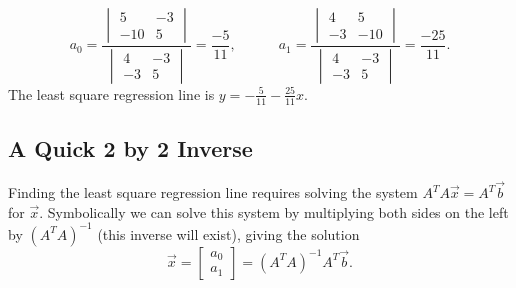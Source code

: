 \begin{example}
$$
a_0
=\frac{\begin{vmatrix}
5&-3\\
-10&5
\end{vmatrix}}{\begin{vmatrix}
4&-3\\
-3&5
\end{vmatrix}}
=\dfrac{-5}{11}
, \quad\quad\quad
a_1
=\frac{\begin{vmatrix}
4&5\\
-3&-10
\end{vmatrix}}{\begin{vmatrix}
4&-3\\
-3&5
\end{vmatrix}}
=\dfrac{-25}{11}
.$$
The least square regression line is $y=-\frac{5}{11}-\frac{25}{11}x$.
\end{example}
















\subsection{A Quick 2 by 2 Inverse}
Finding the least square regression line requires solving the system $A^TA\vec x = A^T \vec b$ for $\vec x$. Symbolically we can solve this system by multiplying both sides on the left by $(A^TA)^{-1}$ (this inverse will exist), giving the solution 
$$\vec x = \begin{bmatrix}a_0\\a_1\end{bmatrix}= (A^TA)^{-1}A^T \vec b.$$ 

